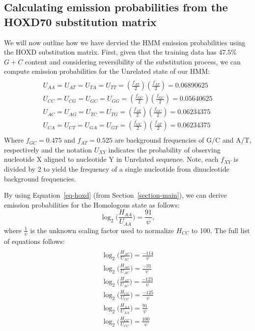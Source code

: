 \subsection*{Calculating emission probabilities from the HOXD70 substitution matrix}
We will now outline how we have dervied the HMM emission probabilities using the HOXD substitution matrix. First, given that the training
data has $47.5\%$~$G+C$ content and considering reversibility of the substitution process, we can compute emission probabilities for the Unrelated state
of our HMM:
\begin{multline}\\
U_{AA}=U_{AT}=U_{TA}=U_{TT}=(\frac{f_{AT}}{2})(\frac{f_{AT}}{2})
= 0.06890625 \\
U_{CC}=U_{CG}=U_{GC}=U_{GG}=(\frac{f_{GC}}{2})(\frac{f_{GC}}{2}) =
0.05640625 \\
U_{AC}=U_{AG}=U_{TC}=U_{TG}=(\frac{f_{AT}}{2})(\frac{f_{GC}}{2}) =
0.06234375 \\
U_{CA}=U_{CT}=U_{GA}=U_{GT}=(\frac{f_{GC}}{2})(\frac{f_{AT}}{2}) =
0.06234375 \\
\label{eq-ff}
\end{multline}
Where $f_{GC}=0.475$ and $f_{AT}=0.525$ are background frequencies of
G/C and A/T, respectively and the notation $U_{XY}$ indicates the probability of observing nucleotide X aligned to
nucleotide Y in Unrelated sequence.    Note, each $f_{XY}$ is divided by 2 to yield the frequency of a single nucleotide from dinucleotide background frequencies.

By using Equation~\ref{eq-hoxd} (from Section~\ref{section-main}), we can derive emission probabilities for
the Homologous state as follows:
\begin{equation}
\log_{2}\bigg(\frac{H_{AA}}{U_{AA}}\bigg) = \frac{91}{\psi},
\end{equation}
where $\frac{1}{\psi}$ is the unknown scaling factor used to normalize $H_{CC}$ to 100. The full list of equations follows:
\begin{multline}\\
\log_{2}\bigg(\frac{H_{AC}}{U_{AC}}\bigg) = \frac{-114}{\psi}\\
\log_{2}\bigg(\frac{H_{AG}}{U_{AC}}\bigg) = \frac{-31}{\psi}\\
\log_{2}\bigg(\frac{H_{AT}}{U_{AC}}\bigg) = \frac{-123}{\psi}\\
\log_{2}\bigg(\frac{H_{CG}}{U_{CC}}\bigg) = \frac{-125}{\psi}\\
\log_{2}\bigg(\frac{H_{AA}}{U_{AA}}\bigg) = \frac{91}{\psi}\\
\log_{2}\bigg(\frac{H_{CC}}{U_{CC}}\bigg) = \frac{100}{\psi}\\
\end{multline}

